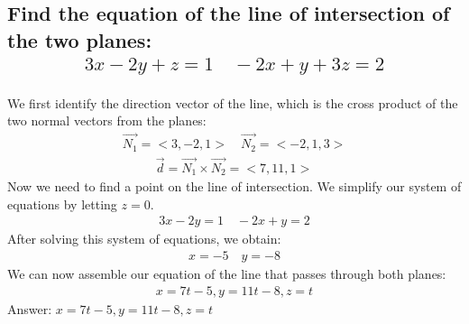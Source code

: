 \documentclass{article}
\begin{document}
\subsection{Find the equation of the line of intersection of the two planes:
	\begin{align*}
		3x - 2y + z = 1 \quad -2x + y + 3z = 2
	\end{align*}
}
We first identify the direction vector of the line, which is the cross product of the two normal vectors from the planes:
\begin{align*}
	\vec{N_1} = <3, -2, 1> \quad \vec{N_2} = <-2, 1, 3>
\end{align*}
\begin{align*}
	\vec{d} = \vec{N_1} \times \vec{N_2} = <7, 11, 1>
\end{align*}
Now we need to find a point on the line of intersection. We simplify our system of equations by letting $z = 0$. 
\begin{align*}
	3x - 2y = 1 \quad -2x + y = 2
\end{align*}
After solving this system of equations, we obtain:
\begin{align*}
	x = -5 \quad y = -8
\end{align*}
We can now assemble our equation of the line that passes through both planes:
\begin{align*}
	x = 7t - 5, y = 11t - 8, z = t
\end{align*}
Answer: $x = 7t - 5, y = 11t - 8, z = t$
\end{document}
